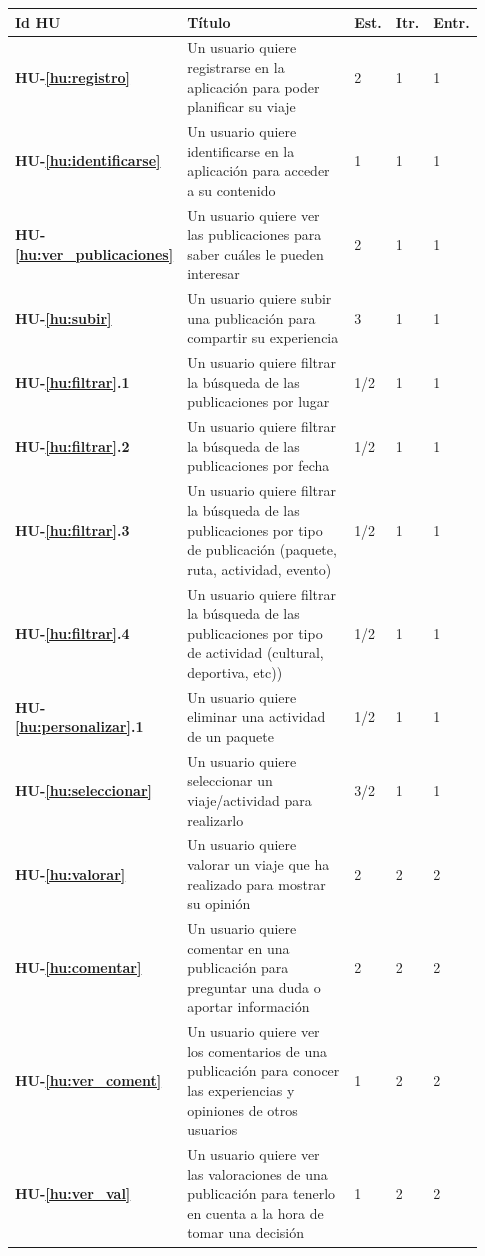 \documentclass[11pt]{article}
\begin{document}
 \begin{longtable}{p{0.13\linewidth}p{0.65\linewidth}p{0.05\linewidth}p{0.05\linewidth}p{0.05\linewidth}}
	\toprule
	\textbf{Id HU} & \textbf{Título} & \textbf{Est.} & \textbf{Itr.} & \textbf{Entr.}\\
	\midrule
	\textbf{HU-\ref{hu:registro}} & Un usuario quiere registrarse en la aplicación para poder planificar su viaje & 2  & 1 & 1\\
	\textbf{HU-\ref{hu:identificarse}} & Un usuario quiere identificarse en la aplicación para  acceder a su contenido & 1 & 1 & 1\\
	\textbf{HU-\ref{hu:ver_publicaciones}} & Un usuario quiere ver las publicaciones para saber cuáles le pueden interesar & 2 & 1 & 1\\
	\textbf{HU-\ref{hu:subir}} & Un usuario quiere subir una publicación para compartir su experiencia & 3 & 1 & 1\\
	\textbf{HU-\ref{hu:filtrar}.1} & Un usuario quiere filtrar la búsqueda de las publicaciones por lugar & 1/2 & 1 & 1\\ 
	\textbf{HU-\ref{hu:filtrar}.2} & Un usuario quiere filtrar la búsqueda de las publicaciones por fecha & 1/2 & 1 & 1\\ 
	\textbf{HU-\ref{hu:filtrar}.3} & Un usuario quiere filtrar la búsqueda de las publicaciones por tipo de publicación (paquete, ruta, actividad, evento) & 1/2 & 1 & 1\\ 
	\textbf{HU-\ref{hu:filtrar}.4} & Un usuario quiere filtrar la búsqueda de las publicaciones por tipo de actividad (cultural, deportiva, etc)) & 1/2 & 1 & 1\\ 
	\textbf{HU-\ref{hu:personalizar}.1} & Un usuario quiere eliminar una actividad de un paquete & 1/2 & 1 & 1\\ 
	\textbf{HU-\ref{hu:seleccionar}} & Un usuario quiere seleccionar un viaje/actividad para realizarlo & 3/2 & 1 & 1\\ 
	\textbf{HU-\ref{hu:valorar}} & Un usuario quiere valorar un viaje que ha realizado para mostrar su opinión & 2 & 2 & 2\\
	\textbf{HU-\ref{hu:comentar}} & Un usuario quiere comentar en una publicación para preguntar una duda o aportar información & 2 & 2 & 2\\ 
	\textbf{HU-\ref{hu:ver_coment}} & Un usuario quiere ver los comentarios de una publicación para conocer las experiencias y opiniones de otros usuarios & 1 & 2 & 2\\
	\textbf{HU-\ref{hu:ver_val}} & Un usuario quiere ver las valoraciones de una publicación para tenerlo en cuenta a la hora de tomar una decisión & 1 & 2 & 2\\  

\end{longtable}
\end{document}
